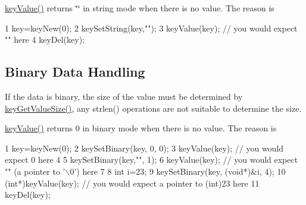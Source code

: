 \hyperlink{group__keyvalue_ga6f29609c5da53c6dc26a98678d5752af}{key\+Value()} returns \char`\"{}\char`\"{} in string mode when there is no value. The reason is 
\begin{DoxyCode}
1 key=keyNew(0);
2 keySetString(key,"");
3 keyValue(key); // you would expect "" here
4 keyDel(key);
\end{DoxyCode}
\hypertarget{group__keyvalue_binary}{}\subsection{Binary Data Handling}\label{group__keyvalue_binary}
If the data is binary, the size of the value must be determined by \hyperlink{group__keyvalue_gae326672fffb7474abfe9baf53b73217e}{key\+Get\+Value\+Size()}, any strlen() operations are not suitable to determine the size.

\hyperlink{group__keyvalue_ga6f29609c5da53c6dc26a98678d5752af}{key\+Value()} returns 0 in binary mode when there is no value. The reason is 
\begin{DoxyCode}
1 key=keyNew(0);
2 keySetBinary(key, 0, 0);
3 keyValue(key); // you would expect 0 here
4 
5 keySetBinary(key,"", 1);
6 keyValue(key); // you would expect "" (a pointer to '\(\backslash\)0') here
7 
8 int i=23;
9 keySetBinary(key, (void*)&i, 4);
10 (int*)keyValue(key); // you would expect a pointer to (int)23 here
11 keyDel(key);
\end{DoxyCode}


